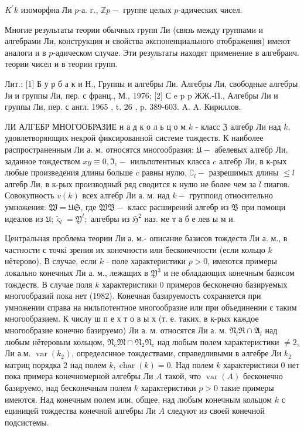 \documentclass[10pt]{article}
\begin{document}
$K^{\prime} k$ изоморфна Ли $p$-а. г., $\mathbb{Z} p-$ группе целых $p$-адических чисел.



Многие результаты теории обычных групп Ли (связь между группами и алгебрами Ли, конструкция и свойства әкспоненциального отображения) имеют аналоги и в $p$-адическом случае. Эти результаты находят применение в алгебраич. теории чисел и в теории групп.



Лит.: [1] Б у р б а к и Н., Группы и алгебры Ли. Алгебры Ли, свободные алгебры Ји и группы Ли, пер. с франц., М., 1976; [2] С e p p ЖЖ.-П., Алгебры Ли и группы Ли, пер. с англ. 1965 , t. 26 , p. 389-603. A. A. Кириллов.



ЛИ АЛГЕБР МНОГООБРАЗИЕ н а д к о л ь ц о м $k$ - класс $\mathfrak{Z}$ алгебр Ли над $k$, удовлетворяющих некрой фиксированной системе тождеств. К наиболее распространенным Ли а. м. относятся многообразия: $\mathfrak{U}-$ абелевых алгебр Ли, заданное тождеством $x y \equiv 0, \mathfrak{I}_{c}-$ нильпотентных класса $c$ алгебр Ли, в к-рых любые произведения длины больше $c$ равны нулю, $\complement_{l}-$ разрешимых длины $\leqslant l$ алгебр Ли, в к-рых производный ряд сводится к нулю не более чем за $l$ пиагов. Совокупность $v(k)$ всех алгебр Ли а. м. над $k-$ группоид относительно умножения: $\mathfrak{W}=\mathfrak{U} \mathfrak{S}$, где $\mathfrak{W} \mathfrak{B}-$ класс расширений алгебр из $\mathfrak{B}$ при помощи идеалов из $\mathfrak{U} ; \widetilde{\varsigma}_{l}=\mathfrak{Y}^{l} ;$ алгебры из $\mathfrak{H}^{2}$ наз. ме т а б е лев ы м и.



Центральная проблема теории Ли а. м.- описание базисов тождеств Ли а. м., в частности с точкі зрения их конечности или бесконечности (если кольцо $k$ нётерово). В случае, если $k$ - поле характеристики $p>0$, имеются примеры локально конечных Ли а. м., лежащих в $\mathfrak{Y}^{3}$ и не обладающих конечным базисом тождеств. В случае поля $k$ характеристики 0 примеров бесконечно базируемых многообразий пока нет (1982). Конечная базируемость сохраняется при умножении справа на нильпотентное многообразие или при объединении с таким многообразием. К числу ш п е х т о в ы х (т. е. таких, в к-рых каждое многообразие конечно базируемо) Ли а. м. относятся Ли а. м. $\mathfrak{N}_{l} \mathfrak{\Re} \cap \mathfrak{A}_{l}$ над любым нётеровым кольцом, $\mathfrak{N}_{c} \mathfrak{M} \cap \mathfrak{N}_{2} \mathfrak{N}_{c}$ над любым полем характеристики $\neq 2$, Ли а.м. $\operatorname{var}\left(k_{2}\right)$, определснное тождествами, справедливыми в алгебре Ли $k_{2}$ матриц порядка 2 над полем $k, \operatorname{char}(k)=0$. Над полем $k$ характеристики 0 нет пока примера конечномерной алгебры Ли $A$ такой, что $\operatorname{var}(A)$ бесконечно базируемо, над бесконечным полем $k$ характеристики $p>0$ такие примеры имеются. Над конечным полем или, общее, над любым конечным кольцом $k$ с ециницей тождества конечной алгебры Ли $A$ следуют из своей конечной подсистемы.
\end{document}
